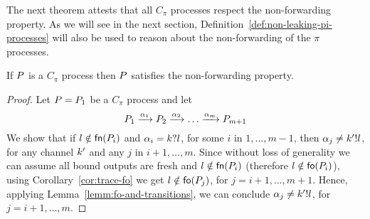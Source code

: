  
The next theorem attests that all $C_\pi$ processes respect the non-forwarding %
property. %
As we will see in the next section, Definition~\ref{def:non-leaking-pi-processes} will also be used to reason about the non-forwarding of the $\pi$ processes.

\begin{theorem}\label{the:non-forwarding}
If $P$ is a $C_\pi$ process then $P$ satisfies the non-forwarding property.
\end{theorem}

\begin{proof}
Let $P=P_1$ be a $C_\pi$ process and let
\[
P_1\xrightarrow{\alpha_1}P_2\xrightarrow{\alpha_2}\ldots\xrightarrow{\alpha_{m}}P_{m+1}
\]
We show that if $l\notin\mathsf{fn}(P_i)$ and $\alpha_i=k?l$, for some $i$ in $1, \ldots, m-1$, then $\alpha_j\not=k'!l$, for any channel $k'$ and any $j$ in $i+1, \ldots,m$.
Since without loss of generality we can assume all bound outputs are fresh
 and $l\notin\mathsf{fn}(P_i)$ (therefore $l\notin\mathsf{fo}(P_i)$), using Corollary~\ref{cor:trace-fo} we get $l\notin\mathsf{fo}(P_j)$, for $j=i+1, \ldots,m+1$. Hence, applying Lemma~\ref{lemm:fo-and-transitions}, we can conclude $\alpha_j\not=k'!l$, for $j=i+1, \ldots,m$.
\end{proof}

